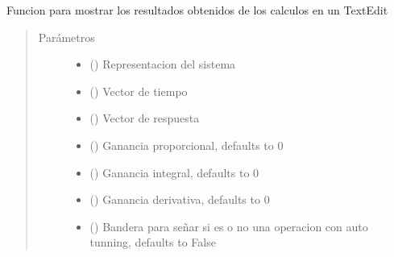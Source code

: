 \documentclass[letterpaper,10pt,spanish]{sphinxmanual}
\begin{document}
\begin{fulllineitems}
\label{\detokenize{codigos/rutinas_PID:rutinas_PID.rutina_system_info}}
Funcion para mostrar los resultados obtenidos de los calculos en un TextEdit
\begin{quote}\begin{description}
\item[{Parámetros}] \leavevmode\begin{itemize}
\item {} 
 () \textendash{} Representacion del sistema

\item {} 
 () \textendash{} Vector de tiempo

\item {} 
 () \textendash{} Vector de respuesta

\item {} 
 (\sphinxstyleliteralemphasis{\sphinxupquote{, }}) \textendash{} Ganancia proporcional, defaults to 0

\item {} 
 (\sphinxstyleliteralemphasis{\sphinxupquote{, }}) \textendash{} Ganancia integral, defaults to 0

\item {} 
 (\sphinxstyleliteralemphasis{\sphinxupquote{, }}) \textendash{} Ganancia derivativa, defaults to 0

\item {} 
 (\sphinxstyleliteralemphasis{\sphinxupquote{, }}) \textendash{} Bandera para señar si es o no una operacion con auto tunning, defaults to False

\end{itemize}

\end{description}\end{quote}

\end{fulllineitems}
\end{document}
